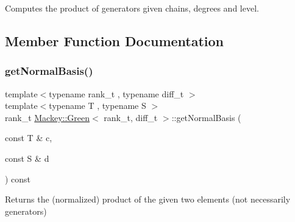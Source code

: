 Computes the product of generators given chains, degrees and level. 



\subsection{Member Function Documentation}
\mbox{\label{classMackey_1_1Green_a35594da87192177ce4bb623ad1b30c84}} 
\subsubsection{\texorpdfstring{get\+Normal\+Basis()}{getNormalBasis()}\hspace{0.1cm}{\footnotesize\ttfamily [1/4]}}
{\footnotesize\ttfamily template$<$typename rank\+\_\+t , typename diff\+\_\+t $>$ \\
template$<$typename T , typename S $>$ \\
rank\+\_\+t \hyperlink{classMackey_1_1Green}{Mackey\+::\+Green}$<$ rank\+\_\+t, diff\+\_\+t $>$\+::get\+Normal\+Basis (\begin{DoxyParamCaption}\item[{const T \&}]{c,  }\item[{const S \&}]{d }\end{DoxyParamCaption}) const}



Returns the (normalized) product of the given two elements (not necessarily generators) 

